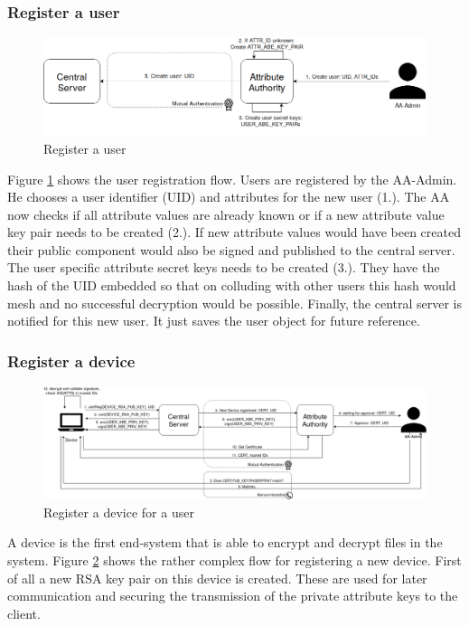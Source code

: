 \subsubsection{Register a user}
\begin{figure}[!h]
\centering
    \includegraphics[width=\linewidth]{img/user_register.png}
    \caption{Register a user}
    \label{fig:user-register}
\end{figure}

Figure \ref{fig:user-register} shows the user registration flow. Users are registered by the AA-Admin. He chooses a user identifier (UID) and attributes for the new user (1.).  The AA now checks if all attribute values are already known or if a new attribute value key pair needs to be created (2.). If new attribute values would have been created their public component would also be signed and published to the central server. The user specific attribute secret keys needs to be created (3.). They have the hash of the UID embedded so that on colluding with other users this hash would mesh and no successful decryption would be possible. Finally, the central server is notified for this new user. It just saves the user object for future reference.

\subsubsection{Register a device}
\label{sec:register-a-device}
\begin{figure}[!h]
\centering
    \includegraphics[width=\linewidth]{img/device_register.png}
    \caption{Register a device for a user}
    \label{fig:device-register}
\end{figure}

A device is the first end-system that is able to encrypt and decrypt files in the system. Figure \ref{fig:device-register} shows the rather complex flow for registering a new device. First of all a new RSA key pair on this device is created. These are used for later communication and securing the transmission of the private attribute keys to the client. 

